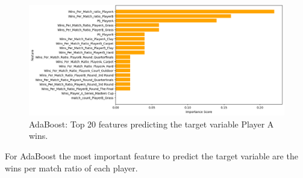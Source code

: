 \documentclass[preprint,aps,nofootinbib,a4paper,superscriptaddress,longbibliography,amsfonts,amssymb,amsmath,titlepage]{revtex4-2}
\begin{document}
%
\begin{figure}[h]
\includegraphics[width=\textwidth]{pictures/most-important-ada.png}
\caption{AdaBoost: Top 20 features predicting the target variable Player A wins.}
\label{most-important-ada}
\end{figure}
%
For AdaBoost the most important feature to predict the target variable are the wins per match ratio of each player.
\end{document}
